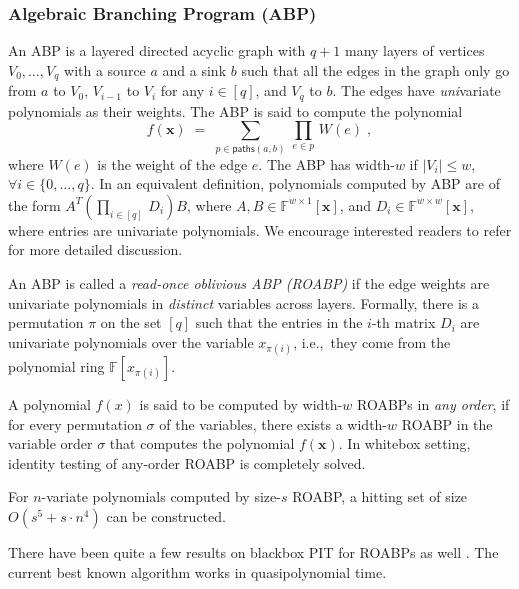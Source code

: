 \documentclass[10pt,a4paper]{article}
\newcommand{\F}{\mathbb{F}}
\newcommand{\x}{{\boldsymbol x}}
\numberwithin{equation}{section}
\begin{document}
\subsubsection*{Algebraic Branching Program (ABP)}
An ABP is a layered directed acyclic graph with $q+1$ many layers of vertices $V_0,\hdots,V_q$ with a source $a$ and a sink $b$ such that all the edges in the graph only go from $a$ to $V_0$, $V_{i-1}$ to $V_i$ for any $i\in [q]$, and $V_q$ to $b$. The edges have {\em uni}variate polynomials as their weights. 
The ABP is said to compute the polynomial \[ f(\x)\;=\;\sum_{p \in \mathsf{paths}(a,b)}\, \prod_{e \in p}\,W(e)\;,\]
where $W(e)$ is the weight of the edge $e$. The ABP has width-$w$ if $|V_i| \le w$, $\forall i \in \{0,\ldots,q\}$. In an equivalent definition, polynomials computed by ABP are of the form $A^T (\prod_{i \in [q]}\, D_i) B$, where $A, B \in \F^{w \times 1}[\x]$, and $D_i \in \F^{w \times w}[\x]$, where entries are univariate polynomials. We encourage interested readers to refer \cite{shpilka2010arithmetic, Mah13} for more detailed discussion.

\begin{definition}
An ABP is called a {\em read-once oblivious ABP (ROABP)} if the edge weights are univariate polynomials in \emph{distinct} variables across layers. Formally, there is a permutation $\pi$ on the set $[q]$ such that the entries in the $i$-th matrix $D_i$ are univariate polynomials over the variable $x_{\pi(i)}$, i.e.,~they come from the polynomial
ring $\F[x_{\pi(i)}]$.
\end{definition}

A polynomial $f(x)$ is said to be computed by width-$w$ ROABPs in \emph{any order}, if for every permutation $\sigma$ of the variables, there exists a width-$w$ ROABP in the variable order $\sigma$ that computes the polynomial $f(\x)$. In whitebox setting, identity testing of any-order ROABP is completely solved. 

\begin{theorem} \label{thm:white-pit-ro}
    For $n$-variate polynomials computed by size-$s$ ROABP, a hitting set of size $O(s^5 + s \cdot n^4)$ can be constructed.    
\end{theorem}

There have been quite a few results on blackbox PIT for ROABPs as well \cite{forbes2013quasipolynomial,forbes2014hitting,gurjarARO}. The current best known algorithm works in quasipolynomial time.  
\end{document}
